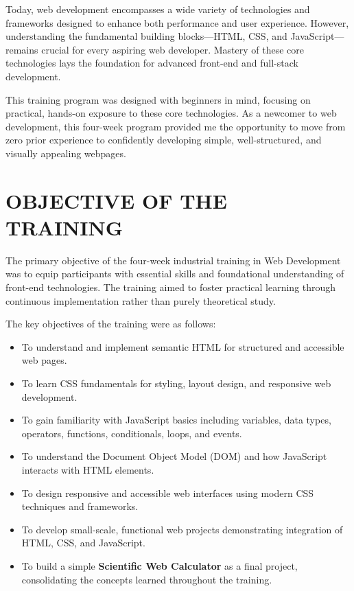 \documentclass[a4paper,12pt,oneside]{report}
\numberwithin{equation}{chapter}
\numberwithin{figure}{chapter}
\numberwithin{table}{chapter}
\begin{document}
Today, web development encompasses a wide variety of technologies and frameworks designed to enhance both performance and user experience. However, understanding the fundamental building blocks—HTML, CSS, and JavaScript—remains crucial for every aspiring web developer. Mastery of these core technologies lays the foundation for advanced front-end and full-stack development. 

This training program was designed with beginners in mind, focusing on practical, hands-on exposure to these core technologies. As a newcomer to web development, this four-week program provided me the opportunity to move from zero prior experience to confidently developing simple, well-structured, and visually appealing webpages.

\section{OBJECTIVE OF THE TRAINING}

The primary objective of the four-week industrial training in Web Development was to equip participants with essential skills and foundational understanding of front-end technologies. The training aimed to foster practical learning through continuous implementation rather than purely theoretical study.

The key objectives of the training were as follows:

\begin{itemize}
    \item To understand and implement semantic HTML for structured and accessible web pages.
    \item To learn CSS fundamentals for styling, layout design, and responsive web development.
    \item To gain familiarity with JavaScript basics including variables, data types, operators, functions, conditionals, loops, and events.
    \item To understand the Document Object Model (DOM) and how JavaScript interacts with HTML elements.
    \item To design responsive and accessible web interfaces using modern CSS techniques and frameworks.
    \item To develop small-scale, functional web projects demonstrating integration of HTML, CSS, and JavaScript.
    \item To build a simple \textbf{Scientific Web Calculator} as a final project, consolidating the concepts learned throughout the training.
\end{itemize}
\end{document}
